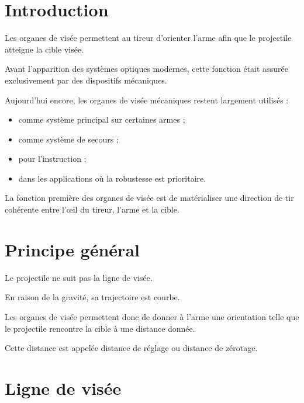 
\section{Introduction}

Les organes de visée permettent au tireur d'orienter l'arme afin que le
projectile atteigne la cible visée.

Avant l'apparition des systèmes optiques modernes, cette fonction était
assurée exclusivement par des dispositifs mécaniques.

Aujourd'hui encore, les organes de visée mécaniques restent largement
utilisés :

\begin{itemize}
    \item comme système principal sur certaines armes ;
    \item comme système de secours ;
    \item pour l'instruction ;
    \item dans les applications où la robustesse est prioritaire.
\end{itemize}

\begin{aretenir}

La fonction première des organes de visée est de matérialiser une direction
de tir cohérente entre l'œil du tireur, l'arme et la cible.

\end{aretenir}

\section{Principe général}

Le projectile ne suit pas la ligne de visée.

En raison de la gravité, sa trajectoire est courbe.

Les organes de visée permettent donc de donner à l'arme une orientation telle
que le projectile rencontre la cible à une distance donnée.

Cette distance est appelée distance de réglage ou distance de zérotage.

\section{Ligne de visée}

